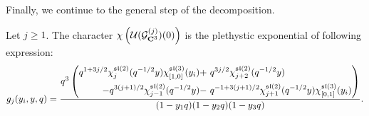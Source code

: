 \documentclass[../main.tex]{subfiles}
\begin{document}
\parsec[]
Finally, we continue to the general step of the decomposition.

\begin{prop}
Let $j\geq 1$. The character $\chi \left( \mathcal{U}(\mathcal{G}^{(j)} _{\mathbf{C}^3}) (0)\right )$  is the plethystic exponential of following expression:
\begin{equation}\label{eqn:6dtwo}
g_{j} (y_i,y,q) =  \frac{ q^{3} \left( \begin{aligned} q^{1 + 3 j/2} \chi^{\mathfrak{sl}(2)}_{j}(q^{-1/2} y)\chi^{\mathfrak{sl}(3)}_{[1,0]}(y_i) + \  & q^{3j/2} \chi^{\mathfrak{sl}(2)}_{j+2}(q^{-1/2} y)  \\
 - q^{3(j+1)/2} \chi^{\mathfrak{sl}(2)}_{j-1}(q^{-1/2}y) - \ & q^{-1 + 3(j+1)/2} \chi^{\mathfrak{sl}(2)}_{j+1} (q^{-1/2} y) \chi^{\mathfrak{sl}(3)}_{[0,1]}(y_i) \end{aligned} \right)}{(1-y_1 q)(1-y_2q)(1-y_3q)}.
\end{equation}
\end{prop}
\end{document}
